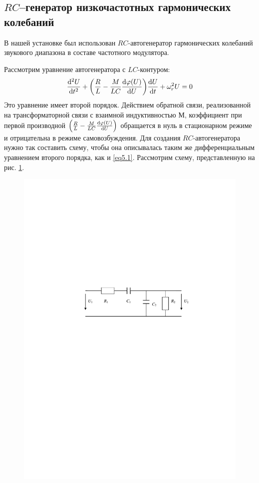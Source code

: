 \subsection{$RC$--генератор низкочастотных гармонических колебаний}

В нашей установке был использован $RC$-автогенератор гармонических колебаний звукового диапазона в составе частотного модулятора.

Рассмотрим уравнение автогенератора с $LC$-контуром:
\begin{gather}
	\label{eq5.1}
	\dv[2]{U}{t}+
	\qty(
		\frac{R}{L} - 
		\frac{M}{LC}\dv{\varphi(U)}{U}
	)\dv{U}{t}+
	\omega_r^2U=0
\end{gather}
Это уравнение имеет второй порядок. Действием обратной связи, реализованной на трансформаторной связи с взаимной индуктивностью $М$, коэффициент при первой производной 
$\qty(
	\frac{R}{L} - 
	\frac{M}{LC}\dv{\varphi(U)}{U}
)$  
обращается в нуль в стационарном режиме и отрицательна в режиме самовозбуждения. Для создания $RC$-автогенератора нужно так составить схему, чтобы она описывалась таким же дифференциальным уравнением второго порядка, как и \eqref{eq5.1}. Рассмотрим схему, представленную на рис. \ref{fig:5.1}. 
\begin{figure}[H]
	\centering
	\includegraphics[]{fig/fig5-1.pdf}
	\caption{}
	\label{fig:5.1}
\end{figure}
